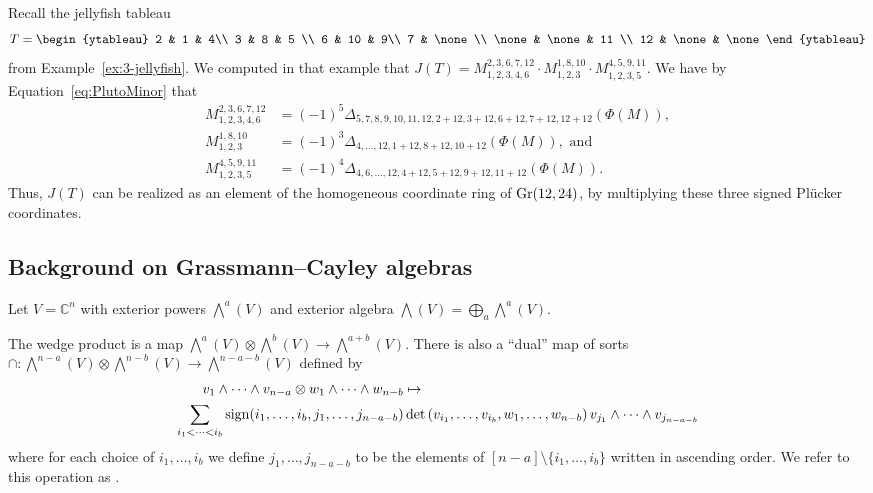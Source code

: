 \begin{example}
Recall the jellyfish tableau
\[
T= \begin{ytableau}
2 & 1 & 4\\
3 & 8 & 5 \\
6 & 10 & 9\\
7 & \none \\
\none & \none & 11 \\
12 & \none & \none
\end{ytableau}
\] from Example~\ref{ex:3-jellyfish}. We computed in that example that $J(T)= M_{1,2,3,4,6}^{2,3,6,7,12} \cdot M_{1,2,3}^{1,8,10}\cdot M_{1,2,3,5}^{4,5,9,11}$.
We have by Equation~\eqref{eq:PlutoMinor} that
\begin{align*}M_{1,2,3,4,6}^{2,3,6,7,12} &=(-1)^5\Delta_{5,7,8,9,10,11,12,2+12,3+12,6+12,7+12,12+12}(\Phi(M)), \\
M_{1,2,3}^{1,8,10} &= (-1)^3\Delta_{4,\dots,12,1+12,8+12,10+12}(\Phi(M)), \text{ and} \\ M_{1,2,3,5}^{4,5,9,11} &= (-1)^4\Delta_{4,6,\ldots,12,4+12,5+12,9+12,11+12}(\Phi(M)).\end{align*}
Thus, $J(T)$ can be realized as an element of the homogeneous coordinate ring of ${\rm Gr}(12,24)$, by multiplying these three signed Pl\"ucker coordinates.
\end{example}

\subsection{Background on Grassmann--Cayley algebras}\label{sec:GrassmanCayleyalgebras}
Let $V = \mathbb{C}^n$ with exterior powers $\bigwedge^a(V) $ and exterior algebra $\bigwedge(V) = \bigoplus_{a} \bigwedge^a(V)$. 

The wedge product is a map $\bigwedge^a(V) \otimes \bigwedge^b(V) \to \bigwedge^{a+b}(V)$. There is also a ``dual'' map of sorts $\cap \colon \bigwedge^{n-a}(V) \otimes \bigwedge^{n-b}(V) \to \bigwedge^{n-a-b}(V)$ defined by
{\small
\begin{align}\label{eq:meetoperation}
v_1 \wedge \cdots \wedge v_{n-a} \otimes w_1 \wedge \cdots \wedge w_{n-b} &\mapsto \\ \sum_{i_1 < \cdots < i_{b}} {\rm sign}(i_1,\dots,i_b,j_1,\dots,j_{n-a-b}) &\det\left(v_{i_1},\dots,v_{i_b},w_1,\dots,w_{n-b}\right)v_{j_1} \wedge \cdots \wedge v_{j_{n-a-b}}\nonumber
\end{align}
}
where for each choice of $i_1,\dots,i_b$ we define $j_1,\dots,j_{n-a-b}$ to be the elements of $[n-a] \setminus \{i_1,\dots,i_b\}$ written in ascending order. We refer to this operation as .

